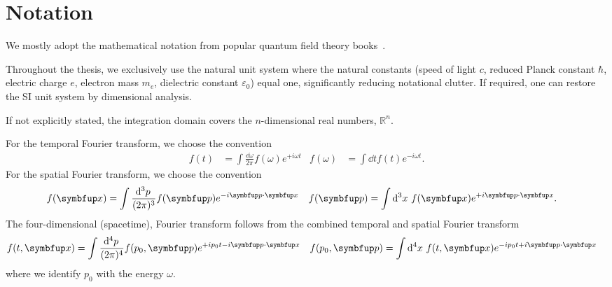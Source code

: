 \section*{Notation}

We mostly adopt the mathematical notation from popular quantum field theory books~\cite{Weinberg1995,Peskin1995}.

Throughout the thesis, we exclusively use the natural unit system where the natural constants (speed of light $c$, reduced Planck constant $\hbar$, electric charge $e$, electron mass $m_e$, dielectric constant $\varepsilon_0$) equal one, significantly reducing notational clutter.
If required, one can restore the SI unit system by dimensional analysis.

If not explicitly stated, the integration domain covers the $n$-dimensional real numbers, $\mathbb{R}^n$.

For the temporal Fourier transform, we choose the convention
\begin{align*}
	f(t)
	&=
	\int\frac{\dd{\omega}}{2\pi}
	f(\omega)
	e^{+i\omega t}
	&
	f(\omega)
	&=
	\int\dd{t}
	f(t)
	e^{-i\omega t}
	.
\end{align*}
For the spatial Fourier transform, we choose the convention
\begin{align*}
	f(\vb{x})
	&=
	\int\frac{\dd[3]{p}}{(2\pi)^3}
	f(\vb{p})
	e^{-i\vb{p}\vdot\vb{x}}
	&
	f(\vb{p})
	&=
	\int\dd[3]{x}
	f(\vb{x})
	e^{+i\vb{p}\vdot\vb{x}}
	.
\end{align*}
The four-dimensional (spacetime), Fourier transform follows from the combined temporal and spatial Fourier transform
\begin{align*}
	f(t,\vb{x})
	&=
	\int\frac{\dd[4]{p}}{(2\pi)^4}
	f(p_0,\vb{p})
	e^{+ip_0 t-i\vb{p}\vdot\vb{x}}
	&
	f(p_0,\vb{p})
	&=
	\int\dd[4]{x}
	f(t,\vb{x})
	e^{-ip_0 t+i\vb{p}\vdot\vb{x}}
\end{align*}
where we identify $p_0$ with the energy $\omega$.

